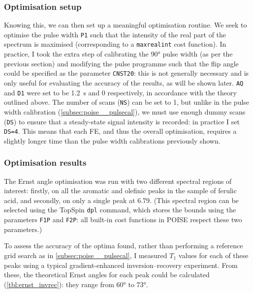 \subsubsection{Optimisation setup}

Knowing this, we can then set up a meaningful optimisation routine.
We seek to optimise the pulse width \texttt{P1} such that the intensity of the real part of the spectrum is maximised (corresponding to a \texttt{maxrealint} cost function).
In practice, I took the extra step of calibrating the \ang{90} pulse width (as per the previous section) and modifying the pulse programme such that the flip angle could be specified as the parameter \texttt{CNST20}: this is not generally necessary and is only useful for evaluating the accuracy of the results, as will be shown later.
\texttt{AQ} and \texttt{D1} were set to be \qty{1.2}{\s} and 0 respectively, in accordance with the theory outlined above.
The number of scans (\texttt{NS}) can be set to 1, but unlike in the pulse width calibration (\cref{subsec:poise__pulsecal}), we must use enough dummy scans (\texttt{DS}) to ensure that a steady-state signal intensity is recorded: in practice I set \texttt{DS=4}.
This means that each FE, and thus the overall optimisation, requires a slightly longer time than the pulse width calibrations previously shown.


\subsubsection{Optimisation results}

The Ernst angle optimisation was run with two different spectral regions of interest: firstly, on all the aromatic and olefinic peaks in the sample of ferulic acid, and secondly, on only a single peak at \qty{6.79}{\ppm}.
(This spectral region can be selected using the TopSpin \texttt{dpl} command, which stores the bounds using the parameters \texttt{F1P} and \texttt{F2P}: all built-in cost functions in POISE respect these two parameters.)

To assess the accuracy of the optima found, rather than performing a reference grid search as in \cref{subsec:poise__pulsecal}, I measured $T_1$ values for each of these peaks using a typical gradient-enhanced inversion--recovery experiment.
From these, the theoretical Ernst angles for each peak could be calculated (\cref{tbl:ernst_invrec}): they range from \ang{60} to \ang{73}.

